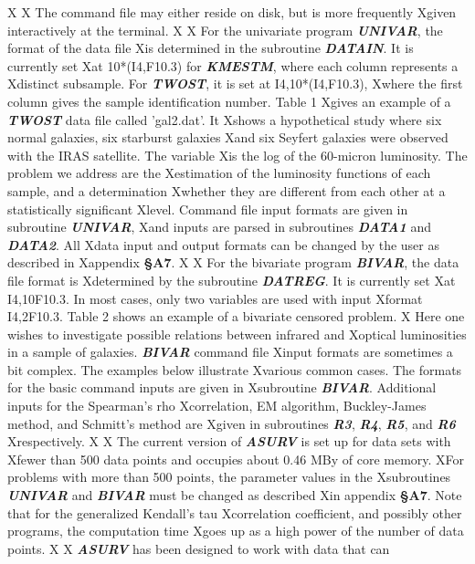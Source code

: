 X
X     The command file may either reside on disk, but is more frequently
Xgiven interactively at the terminal.
X
X     For the univariate program {\sl\bf UNIVAR}, the format of the data file 
Xis determined in the subroutine {\sl\bf DATAIN}.  It is currently set 
Xat 10*(I4,F10.3) for {\sl\bf KMESTM}, where each column represents a 
Xdistinct subsample.  For {\sl\bf TWOST}, it is set at I4,10*(I4,F10.3), 
Xwhere the first column gives the sample identification number. Table 1 
Xgives an example of a {\sl\bf TWOST} data file called 'gal2.dat'. It 
Xshows a hypothetical study where six normal galaxies, six starburst galaxies 
Xand six Seyfert galaxies were observed with the IRAS satellite. The variable 
Xis the log of the 60-micron luminosity.  The problem we address are the
Xestimation of the luminosity functions of each sample, and a determination 
Xwhether they are different from each other at a statistically significant 
Xlevel.  Command file input formats are given in subroutine {\sl\bf UNIVAR}, 
Xand inputs are parsed in subroutines {\sl\bf DATA1} and {\sl\bf DATA2}.  All 
Xdata input and output formats can be changed by the user as described in 
Xappendix {\bf \S A7}.
X
X     For the bivariate program {\sl\bf BIVAR}, the data file format is 
Xdetermined by the subroutine {\sl\bf DATREG}.  It is currently set 
Xat I4,10F10.3.  In most cases, only two variables are used with input 
Xformat I4,2F10.3.  Table 2 shows an example of a bivariate censored problem. 
X Here one wishes to investigate possible relations between infrared and 
Xoptical luminosities in a sample of galaxies. {\sl\bf BIVAR} command file 
Xinput formats are sometimes a bit complex. The examples below illustrate 
Xvarious common cases.  The formats for the basic command inputs are given in 
Xsubroutine {\sl\bf BIVAR}.  Additional inputs for the Spearman's rho 
Xcorrelation, EM algorithm, Buckley-James method, and Schmitt's method are 
Xgiven in subroutines {\sl\bf R3}, {\sl\bf R4}, {\sl\bf R5}, and {\sl\bf R6} 
Xrespectively.
X 
X     The current version of {\sl\bf ASURV} is set up for data sets with 
Xfewer than 500 data points and occupies about 0.46 MBy of core memory. 
XFor problems with more than 500 points, the parameter values in the 
Xsubroutines {\sl\bf UNIVAR} and {\sl\bf BIVAR} must be changed as described 
Xin appendix {\bf\S A7}.  Note that for  the generalized Kendall's tau 
Xcorrelation coefficient, and possibly other programs,  the computation time 
Xgoes up as a high power of the number of data points. 
X
X     {\sl\bf ASURV} has been designed to work with data that can 
